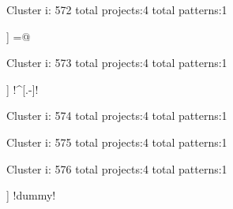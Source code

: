 Cluster i: 572
total projects:4
total patterns:1
\begin{multicols}{1}
\begin{description}[noitemsep,topsep=0pt]
\item [[4] ] \cverb@[=!]=@
\end{description}
\end{multicols}







Cluster i: 573
total projects:4
total patterns:1
\begin{multicols}{1}
\begin{description}[noitemsep,topsep=0pt]
\item [[4] ] \cverb!^[.-]!
\end{description}
\end{multicols}







Cluster i: 574
total projects:4
total patterns:1
\begin{multicols}{1}
\begin{description}[noitemsep,topsep=0pt]
\item [[4] ] \cverb!\\$!
\end{description}
\end{multicols}







Cluster i: 575
total projects:4
total patterns:1
\begin{multicols}{1}
\begin{description}[noitemsep,topsep=0pt]
\item [[4] ] \cverb! |\(!
\end{description}
\end{multicols}







Cluster i: 576
total projects:4
total patterns:1
\begin{multicols}{1}
\begin{description}[noitemsep,topsep=0pt]
\item [[4] ] \cverb!dummy!
\end{description}
\end{multicols}







